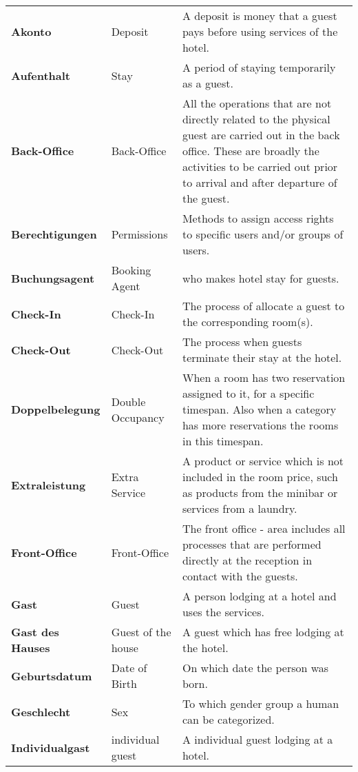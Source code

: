 \documentclass[../Pflichtenheft.tex]{subfiles}
\begin{document}
    \begin{longtable}{p{4cm} p{4cm} p{6cm}}
        \textbf{Akonto} & {Deposit} & A deposit is money that a guest pays before using services of the hotel. \\[0.5cm]
        \textbf{Aufenthalt} & {Stay} & A period of staying temporarily as a guest. \\[0.5cm]
        \textbf{Back-Office} & {Back-Office} & All the operations that are not directly related to the physical guest are carried out in the back office. These are broadly the activities to be carried out prior to arrival and after departure of the guest. \\[0.5cm]
        \textbf{Berechtigungen} & {Permissions} & Methods to assign access rights to specific users and/or groups of users. \\[0.5cm]
        \textbf{Buchungsagent} & {Booking Agent} & who makes hotel stay for guests. \\[0.5cm]
        \textbf{Check-In} & {Check-In} & The process of allocate a guest to the corresponding room(s). \\[0.5cm]
        \textbf{Check-Out} & {Check-Out} & The process when guests terminate their stay at the hotel. \\[0.5cm]
        \textbf{Doppelbelegung} & {Double Occupancy} & When a room has two reservation assigned to it, for a specific timespan. Also when a category has more reservations the rooms in this timespan. \\[0.5cm]
        \textbf{Extraleistung} & {Extra Service} & A product or service which is not included in the room price, such as products from the minibar or services from a laundry. \\[0.5cm]
        \textbf{Front-Office} & {Front-Office} & The front office - area includes all processes that are performed directly at the reception in contact with the guests. \\[0.5cm]
        \textbf{Gast} & {Guest} & A person lodging at a hotel and uses the services. \\[0.5cm]
        \textbf{Gast des Hauses} & {Guest of the house} & A guest which has free lodging at the hotel. \\[0.5cm]
        \textbf{Geburtsdatum} & {Date of Birth} & On which date the person was born. \\[0.5cm]
        \textbf{Geschlecht} & {Sex} & To which gender group a human can be categorized. \\[0.5cm]
        \textbf{Individualgast} & {individual guest} & A individual guest lodging at a hotel. \\[0.5cm]

\end{longtable}
\end{document}
